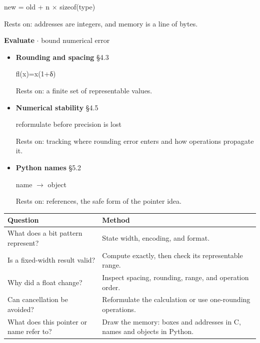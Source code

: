\documentclass[11pt]{article}
\begin{document}
\begin{keepsection}
\begin{itemize}
new = old + n \ensuremath{\times} sizeof(type)

Rests on: addresses are integers, and memory is a line of bytes.
\end{itemize}

\textbf{Evaluate} \ensuremath{\cdot} bound numerical error

\begin{itemize}
\item {}
\textbf{Rounding and spacing} \hfill{\small\color{FAUblue}§4.3}

fl(x)=x(1+δ)

Rests on: a finite set of representable values.
\item {}
\textbf{Numerical stability} \hfill{\small\color{FAUblue}§4.5}

reformulate before precision is lost

Rests on: tracking where rounding error enters and how operations propagate it.
\item {}
\textbf{Python names} \hfill{\small\color{FAUblue}§5.2}

name \ensuremath{\to} object

Rests on: references, the safe form of the pointer idea.
\end{itemize}

\begin{center}\small\begin{tabularx}{\linewidth}{>{\raggedright\arraybackslash}X>{\raggedright\arraybackslash}X}\toprule
\textbf{Question} & \textbf{Method} \\ \midrule
What does a bit pattern represent? & State width, encoding, and format. \\
Is a fixed-width result valid? & Compute exactly, then check its representable range. \\
Why did a float change? & Inspect spacing, rounding, range, and operation order. \\
Can cancellation be avoided? & Reformulate the calculation or use one-rounding operations. \\
What does this pointer or name refer to? & Draw the memory: boxes and addresses in C, names and objects in Python. \\
\bottomrule\end{tabularx}\end{center}
\end{keepsection}
\end{document}
